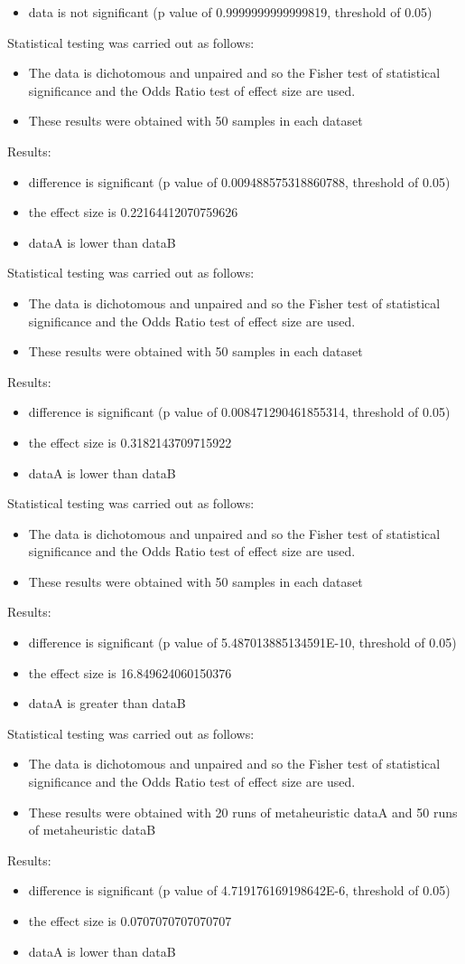 \documentclass[]{article}
\begin{document}
\begin{itemize}
\item{data is not significant (p value of 0.9999999999999819, threshold of 0.05)}
\end{itemize}Statistical testing was carried out as follows: \begin{itemize}
\item{The data is dichotomous and unpaired and so the Fisher test of statistical significance and the Odds Ratio test of effect size are used.}
\item{These results were obtained with 50 samples in each dataset}
\end{itemize}Results:
\begin{itemize}
\item{difference is significant (p value of 0.009488575318860788, threshold of 0.05)}
\item{the effect size is 0.22164412070759626}
\item{dataA is lower than dataB}
\end{itemize}Statistical testing was carried out as follows: \begin{itemize}
\item{The data is dichotomous and unpaired and so the Fisher test of statistical significance and the Odds Ratio test of effect size are used.}
\item{These results were obtained with 50 samples in each dataset}
\end{itemize}Results:
\begin{itemize}
\item{difference is significant (p value of 0.008471290461855314, threshold of 0.05)}
\item{the effect size is 0.3182143709715922}
\item{dataA is lower than dataB}
\end{itemize}Statistical testing was carried out as follows: \begin{itemize}
\item{The data is dichotomous and unpaired and so the Fisher test of statistical significance and the Odds Ratio test of effect size are used.}
\item{These results were obtained with 50 samples in each dataset}
\end{itemize}Results:
\begin{itemize}
\item{difference is significant (p value of 5.487013885134591E-10, threshold of 0.05)}
\item{the effect size is 16.849624060150376}
\item{dataA is greater than dataB}
\end{itemize}Statistical testing was carried out as follows: \begin{itemize}
\item{The data is dichotomous and unpaired and so the Fisher test of statistical significance and the Odds Ratio test of effect size are used.}
\item{These results were obtained with 20 runs of metaheuristic dataA and 50 runs of metaheuristic dataB}
\end{itemize}Results:
\begin{itemize}
\item{difference is significant (p value of 4.719176169198642E-6, threshold of 0.05)}
\item{the effect size is 0.0707070707070707}
\item{dataA is lower than dataB}
\end{itemize}
\end{document}

